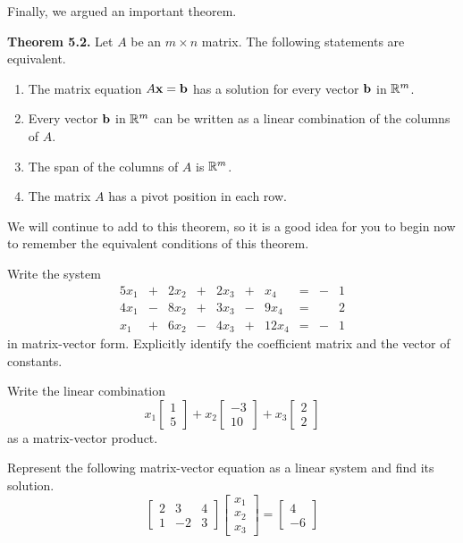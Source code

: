 Finally, we argued an important theorem.

\noindent \textbf{Theorem 5.2.} Let $A$ be an $m \times n$ matrix. The following statements are equivalent.
    \begin{enumerate}
    \item The matrix equation $A \mathbf{x} = \mathbf{b}$ has a solution for every vector $\mathbf{b}$ in $\mathbb{R}^m$.
    \item Every vector $\mathbf{b}$ in $\mathbb{R}^m$ can be written as a linear combination of the columns of $A$.
    \item The span of the columns of $A$ is $\mathbb{R}^m$.
    \item The matrix $A$ has a pivot position in each row.
    \end{enumerate}


We will continue to add to this theorem, so it is a good idea for you to begin now to remember the equivalent conditions of this theorem.





\be
\item Write the system 
\begin{alignat*}{5}
x_1 		&{}+{} 	&{2}x_2 	&{}+{}	&{2}x_3 	&{}+{}	&{}x_4		&{}={}	&{}- &1 \\
{4}x_1 	&{}-{} 	&{8}x_2		&{}+{}	&{3}x_3 	&{}-{}	&{9}x_4		&{}={}	&{} &2 \\
{}x_1 	&{}+{} 	&{6}x_2 	&{}-{}	&{4}x_3		&{}+{}	&{12}x_4	&{}={}	&{}- &1 
\end{alignat*}
in matrix-vector form. Explicitly identify the coefficient matrix and the vector of constants. 

\item Write the linear combination 
\[x_1\left[ \begin{array}{c} 1\\5 \end{array} \right] + x_2\left[ \begin{array}{r} -3\\10 \end{array} \right] + x_3\left[ \begin{array}{c} 2\\2 \end{array} \right] \]
as a matrix-vector product.


\item Represent the following matrix-vector equation as a linear system and find its solution.
\[ \left[ \begin{array}{crc} 2 & 3 & 4 \\ 1 & -2 & 3  \end{array} \right] \left[ \begin{array}{c} x_1 \\ x_2 \\ x_3 \end{array} \right] = \left[ \begin{array}{r} 4\\-6 \end{array} \right] \]

